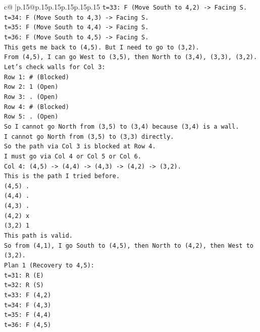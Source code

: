 \documentclass{article}
\begin{document}
{\begin{supertabular}{c@{$\;$}|p{.15\linewidth}@{}p{.15\linewidth}p{.15\linewidth}p{.15\linewidth}p{.15\linewidth}p{.15\linewidth}}
{{{\texttt{t=33: F (Move South to 4,2) {-}> Facing S.} \\
\texttt{t=34: F (Move South to 4,3) {-}> Facing S.} \\
\texttt{t=35: F (Move South to 4,4) {-}> Facing S.} \\
\texttt{t=36: F (Move South to 4,5) {-}> Facing S.} \\
\texttt{This gets me back to (4,5). But I need to go to (3,2).} \\
\texttt{From (4,5), I can go West to (3,5), then North to (3,4), (3,3), (3,2).} \\
\texttt{Let's check walls for Col 3:} \\
\texttt{Row 1: \# (Blocked)} \\
\texttt{Row 2: 1 (Open)} \\
\texttt{Row 3: . (Open)} \\
\texttt{Row 4: \# (Blocked)} \\
\texttt{Row 5: . (Open)} \\
\texttt{So I cannot go North from (3,5) to (3,4) because (3,4) is a wall.} \\
\texttt{I cannot go North from (3,5) to (3,3) directly.} \\
\texttt{So the path via Col 3 is blocked at Row 4.} \\
\texttt{I must go via Col 4 or Col 5 or Col 6.} \\
\texttt{Col 4: (4,5) {-}> (4,4) {-}> (4,3) {-}> (4,2) {-}> (3,2).} \\
\texttt{This is the path I tried before.} \\
\texttt{(4,5) .} \\
\texttt{(4,4) .} \\
\texttt{(4,3) .} \\
\texttt{(4,2) x} \\
\texttt{(3,2) 1} \\
\texttt{This path is valid.} \\
\texttt{So from (4,1), I go South to (4,5), then North to (4,2), then West to (3,2).} \\
\texttt{Plan 1 (Recovery to 4,5):} \\
\texttt{t=31: R (E)} \\
\texttt{t=32: R (S)} \\
\texttt{t=33: F (4,2)} \\
\texttt{t=34: F (4,3)} \\
\texttt{t=35: F (4,4)} \\
\texttt{t=36: F (4,5)} \\
}}}
\end{supertabular}}
\end{document}
